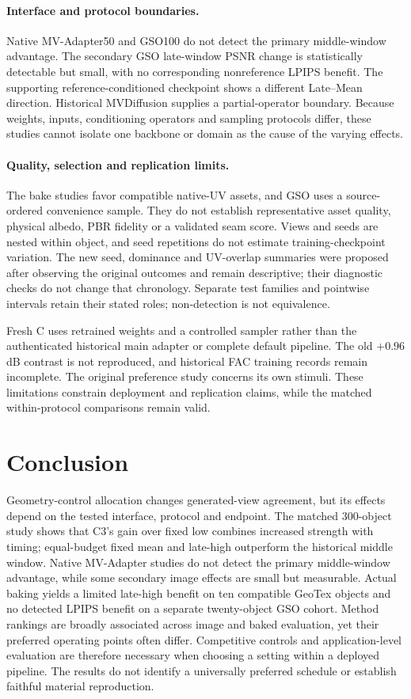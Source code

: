 \documentclass[times,twocolumn,final]{elsarticle}
\begin{document}
\paragraph{Interface and protocol boundaries.}
Native MV-Adapter50 and GSO100 do not detect the primary middle-window advantage. The secondary GSO late-window PSNR change is statistically detectable but small, with no corresponding nonreference LPIPS benefit. The supporting reference-conditioned checkpoint shows a different Late--Mean direction. Historical MVDiffusion supplies a partial-operator boundary. Because weights, inputs, conditioning operators and sampling protocols differ, these studies cannot isolate one backbone or domain as the cause of the varying effects.

\paragraph{Quality, selection and replication limits.}
The bake studies favor compatible native-UV assets, and GSO uses a source-ordered convenience sample. They do not establish representative asset quality, physical albedo, PBR fidelity or a validated seam score. Views and seeds are nested within object, and seed repetitions do not estimate training-checkpoint variation. The new seed, dominance and UV-overlap summaries were proposed after observing the original outcomes and remain descriptive; their diagnostic checks do not change that chronology. Separate test families and pointwise intervals retain their stated roles; non-detection is not equivalence.

Fresh C uses retrained weights and a controlled sampler rather than the authenticated historical main adapter or complete default pipeline. The old $+0.96$ dB contrast is not reproduced, and historical FAC training records remain incomplete. The original preference study concerns its own stimuli. These limitations constrain deployment and replication claims, while the matched within-protocol comparisons remain valid.

\section{Conclusion}
\label{sec:conclusion}

Geometry-control allocation changes generated-view agreement, but its effects depend on the tested interface, protocol and endpoint. The matched 300-object study shows that C3's gain over fixed low combines increased strength with timing; equal-budget fixed mean and late-high outperform the historical middle window. Native MV-Adapter studies do not detect the primary middle-window advantage, while some secondary image effects are small but measurable. Actual baking yields a limited late-high benefit on ten compatible GeoTex objects and no detected LPIPS benefit on a separate twenty-object GSO cohort. Method rankings are broadly associated across image and baked evaluation, yet their preferred operating points often differ. Competitive controls and application-level evaluation are therefore necessary when choosing a setting within a deployed pipeline. The results do not identify a universally preferred schedule or establish faithful material reproduction.
\end{document}

